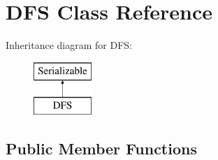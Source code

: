 \hypertarget{class_d_f_s}{}\section{D\+FS Class Reference}
\label{class_d_f_s}
Inheritance diagram for D\+FS\+:\begin{figure}[H]
\begin{center}
\leavevmode
\includegraphics[height=2.000000cm]{class_d_f_s}
\end{center}
\end{figure}
\subsection*{Public Member Functions}
